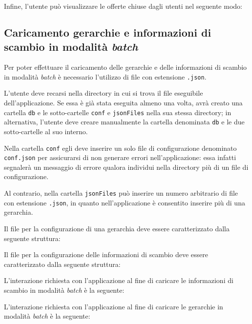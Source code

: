 Infine, l'utente può visualizzare le offerte chiuse dagli utenti nel seguente modo:


\subsection{Caricamento gerarchie e informazioni di scambio in modalità \textit{batch}}
Per poter effettuare il caricamento delle gerarchie e delle informazioni di scambio in modalità \textit{batch} è necessario l'utilizzo di file con estensione \texttt{.json}. 

L'utente deve recarsi nella directory in cui si trova il file eseguibile dell'applicazione. Se essa è già stata eseguita almeno una volta, avrà creato una cartella \texttt{db} e le sotto-cartelle \texttt{conf} e \texttt{jsonFiles} nella sua stessa directory; in alternativa, l'utente deve creare manualmente la cartella denominata \texttt{db} e le due sotto-cartelle al suo interno.

Nella cartella \texttt{conf} egli deve inserire un solo file di configurazione denominato \texttt{conf.json} per assicurarsi di non generare errori nell'applicazione: essa infatti segnalerà un messaggio di errore qualora individui nella directory più di un file di configurazione. 

Al contrario, nella cartella \texttt{jsonFiles} può inserire un numero arbitrario di file con estensione \texttt{.json}, in quanto nell'applicazione è consentito inserire più di una gerarchia. 

Il file per la configurazione di una gerarchia deve essere caratterizzato dalla seguente struttura:


Il file per la configurazione delle informazioni di scambio deve essere caratterizzato dalla seguente struttura:


L'interazione richiesta con l'applicazione al fine di caricare le informazioni di scambio in modalità \textit{batch} è la seguente:


L'interazione richiesta con l'applicazione al fine di caricare le gerarchie in modalità \textit{batch} è la seguente:
